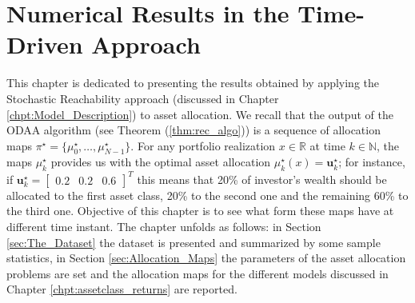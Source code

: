 \chapter{Numerical Results in the Time-Driven Approach}
This chapter is dedicated to presenting the results obtained by applying the Stochastic Reachability approach (discussed in Chapter \ref{chpt:Model_Description}) to asset allocation. We recall that the output of the ODAA algorithm (see Theorem (\ref{thm:rec_algo})) is a sequence of allocation maps $\pi^{\star}=\{\mu_0^{\star},\ldots,\mu_{N-1}^{\star}\}$. For any portfolio realization $x \in \mathbb{R}$ at time $k \in \mathbb{N}$, the maps $\mu_k^{\star}$ provides us with the optimal asset allocation $\mu_k^{\star}(x)=\bm{u}_k^{\star}$; for instance, if $\bm{u}_k^{\star}= \begin{bmatrix}
0.2 & 0.2 & 0.6
\end{bmatrix}^T$ this means that 20\% of investor's wealth should be allocated to the first asset class, 20\% to the second one and the remaining 60\% to the third one. Objective of this chapter is to see what form these maps have at different time instant. The chapter unfolds as follows: in Section \ref{sec:The_Dataset} the dataset is presented and summarized by some sample statistics, in Section \ref{sec:Allocation_Maps} the parameters of the asset allocation problems are set and the allocation maps for the different models discussed in Chapter \ref{chpt:assetclass_returns} are reported.

